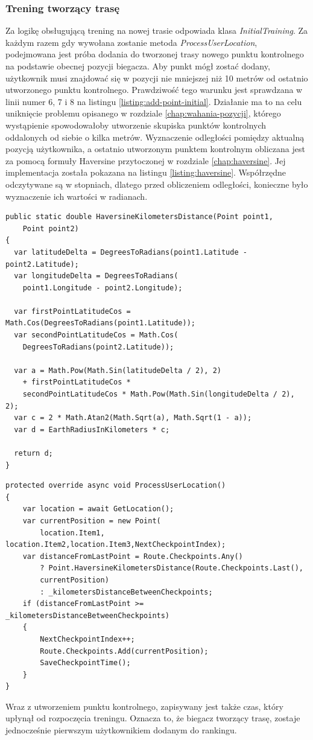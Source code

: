 \subsubsection{Trening tworzący trasę}
Za logikę obsługującą trening na nowej trasie odpowiada klasa \textit{InitialTraining}. Za każdym razem gdy wywołana zostanie metoda \textit{ProcessUserLocation}, podejmowana jest próba dodania do tworzonej trasy nowego punktu kontrolnego na podstawie obecnej pozycji biegacza. Aby punkt mógł zostać dodany, użytkownik musi znajdować się w pozycji nie mniejszej niż 10 metrów od ostatnio utworzonego punktu kontrolnego. Prawdziwość tego warunku jest sprawdzana w linii numer 6, 7 i 8 na listingu \ref{listing:add-point-initial}. Działanie ma to na celu uniknięcie problemu opisanego w rozdziale \ref{chap:wahania-pozycji}, którego wystąpienie spowodowałoby utworzenie skupiska punktów kontrolnych oddalonych od siebie o kilka metrów. Wyznaczenie odległości pomiędzy aktualną pozycją użytkownika, a ostatnio utworzonym punktem kontrolnym obliczana jest za pomocą formuły Haversine przytoczonej w rozdziale \ref{chap:haversine}. Jej implementacja została pokazana na listingu \ref{listing:haversine}. Współrzędne odczytywane są w stopniach, dlatego przed obliczeniem odległości, konieczne było wyznaczenie ich wartości w radianach.
\begin{lstlisting}[caption={Wyznaczenie odległości pomiędzy dwoma punktami},label=listing:haversine]
public static double HaversineKilometersDistance(Point point1,
	Point point2)
{
  var latitudeDelta = DegreesToRadians(point1.Latitude - point2.Latitude);
  var longitudeDelta = DegreesToRadians(
  	point1.Longitude - point2.Longitude);

  var firstPointLatitudeCos = Math.Cos(DegreesToRadians(point1.Latitude));
  var secondPointLatitudeCos = Math.Cos(
  	DegreesToRadians(point2.Latitude));

  var a = Math.Pow(Math.Sin(latitudeDelta / 2), 2)
  	+ firstPointLatitudeCos *
	secondPointLatitudeCos * Math.Pow(Math.Sin(longitudeDelta / 2), 2);
  var c = 2 * Math.Atan2(Math.Sqrt(a), Math.Sqrt(1 - a));
  var d = EarthRadiusInKilometers * c;

  return d;
}
\end{lstlisting}

\begin{lstlisting}[caption={Tworzenie punktów kontrolnych},label=listing:add-point-initial]
protected override async void ProcessUserLocation()
{
    var location = await GetLocation();
    var currentPosition = new Point(
    	location.Item1, location.Item2,location.Item3,NextCheckpointIndex);
    var distanceFromLastPoint = Route.Checkpoints.Any()
        ? Point.HaversineKilometersDistance(Route.Checkpoints.Last(),
        currentPosition)
        : _kilometersDistanceBetweenCheckpoints;
    if (distanceFromLastPoint >= _kilometersDistanceBetweenCheckpoints)
    {
        NextCheckpointIndex++;
        Route.Checkpoints.Add(currentPosition);
        SaveCheckpointTime();
    }
}
\end{lstlisting}
Wraz z utworzeniem punktu kontrolnego, zapisywany jest także czas, który upłynął od rozpoczęcia treningu. Oznacza to, że biegacz tworzący trasę, zostaje jednocześnie pierwszym użytkownikiem dodanym do rankingu.

